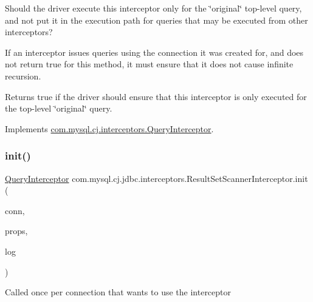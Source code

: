 Should the driver execute this interceptor only for the \char`\"{}original\char`\"{} top-\/level query, and not put it in the execution path for queries that may be executed from other interceptors?

If an interceptor issues queries using the connection it was created for, and does not return {\ttfamily true} for this method, it must ensure that it does not cause infinite recursion.

\begin{DoxyReturn}{Returns}
true if the driver should ensure that this interceptor is only executed for the top-\/level \char`\"{}original\char`\"{} query. 
\end{DoxyReturn}


Implements \mbox{\hyperlink{interfacecom_1_1mysql_1_1cj_1_1interceptors_1_1_query_interceptor_ab12edf90713df907ba400dbe3ba03ea6}{com.\+mysql.\+cj.\+interceptors.\+Query\+Interceptor}}.

\mbox{\label{classcom_1_1mysql_1_1cj_1_1jdbc_1_1interceptors_1_1_result_set_scanner_interceptor_a8b4dccb5d9c1fd75ed0e04fe50a2c087}} 
\subsubsection{\texorpdfstring{init()}{init()}}
{\footnotesize\ttfamily \mbox{\hyperlink{interfacecom_1_1mysql_1_1cj_1_1interceptors_1_1_query_interceptor}{Query\+Interceptor}} com.\+mysql.\+cj.\+jdbc.\+interceptors.\+Result\+Set\+Scanner\+Interceptor.\+init (\begin{DoxyParamCaption}\item[{\mbox{\hyperlink{interfacecom_1_1mysql_1_1cj_1_1_mysql_connection}{Mysql\+Connection}}}]{conn,  }\item[{Properties}]{props,  }\item[{\mbox{\hyperlink{interfacecom_1_1mysql_1_1cj_1_1log_1_1_log}{Log}}}]{log }\end{DoxyParamCaption})}

Called once per connection that wants to use the interceptor

